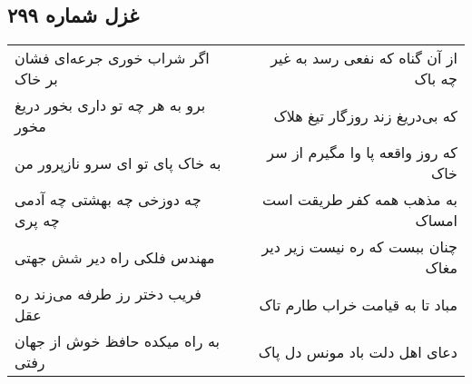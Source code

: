 \begin{center}
\section*{غزل شماره ۲۹۹}
\label{sec:sh299}
\begin{longtable}{l p{0.5cm} r}
اگر شراب خوری جرعه‌ای فشان بر خاک
&&
از آن گناه که نفعی رسد به غیر چه باک
\\
برو به هر چه تو داری بخور دریغ مخور
&&
که بی‌دریغ زند روزگار تیغ هلاک
\\
به خاک پای تو ای سرو نازپرور من
&&
که روز واقعه پا وا مگیرم از سر خاک
\\
چه دوزخی چه بهشتی چه آدمی چه پری
&&
به مذهب همه کفر طریقت است امساک
\\
مهندس فلکی راه دیر شش جهتی
&&
چنان ببست که ره نیست زیر دیر مغاک
\\
فریب دختر رز طرفه می‌زند ره عقل
&&
مباد تا به قیامت خراب طارم تاک
\\
به راه میکده حافظ خوش از جهان رفتی
&&
دعای اهل دلت باد مونس دل پاک
\\
\end{longtable}
\end{center}
